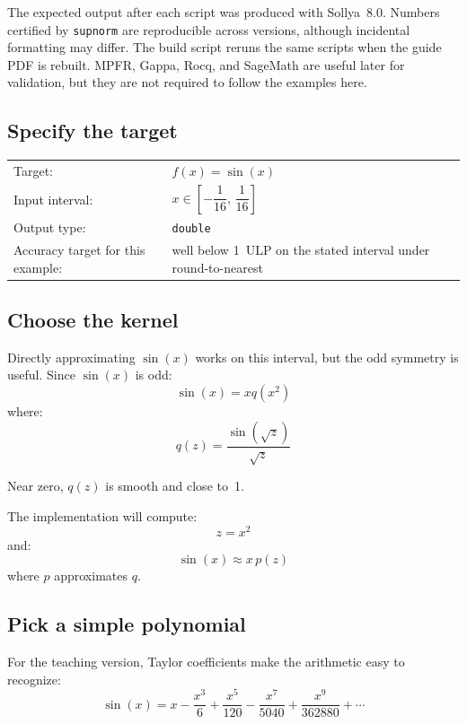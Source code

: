 \documentclass[manuscript, nonacm]{acmart}
\begin{document}
  The expected output after each script was produced with Sollya~8.0. Numbers
  certified by \texttt{supnorm} are reproducible across versions, although
  incidental formatting may differ. The build script reruns the same scripts when
  the guide PDF is rebuilt. MPFR, Gappa, Rocq, and SageMath are useful later for
  validation, but they are not required to follow the examples here.

  \subsection{Specify the target}
  \label{sec:target}

  \begin{center}
    \begin{tabular}{ll}
      Target:                           & $f(x) = \sin(x)$ \\[3pt]
      Input interval:                   & $x \in \left[-\dfrac{1}{16},\, \dfrac{1}{16}\right]$ \\[8pt]
      Output type:                      & \texttt{double} \\[3pt]
      Accuracy target for this example: & well below 1~ULP on the stated interval under round-to-nearest \\
    \end{tabular}
  \end{center}

  \subsection{Choose the kernel}

  Directly approximating $\sin(x)$ works on this interval, but the odd symmetry
  is useful. Since $\sin(x)$ is odd:
  \[
    \sin(x) = x q(x^2)
  \]
  where:
  \[
    q(z) = \frac{\sin(\sqrt{z})}{\sqrt{z}}
  \]

  Near zero, $q(z)$ is smooth and close to~1.

  The implementation will compute:
  \[
    z = x^2
  \]
  and:
  \[
    \sin(x) \approx x\,p(z)
  \]
  where $p$ approximates $q$.

  \subsection{Pick a simple polynomial}

  For the teaching version, Taylor coefficients make the arithmetic easy to
  recognize:
  \[
    \sin(x) = x - \frac{x^3}{6} + \frac{x^5}{120} - \frac{x^7}{5040} +
    \frac{x^9}{362880} + \cdots
  \]
\end{document}
